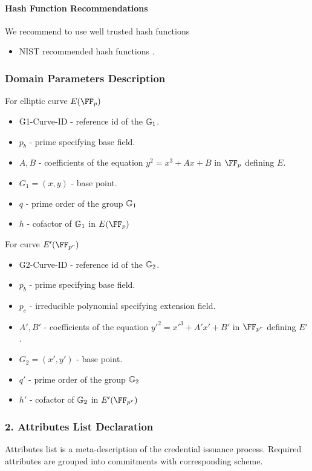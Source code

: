 \paragraph{Hash Function Recommendations}
We recommend to use well trusted hash functions
\begin{itemize}[label=$\circ$]
    \item NIST recommended hash functions \cite{nist-hash}. 
\end{itemize}
\subsubsection*{Domain Parameters Description}
For elliptic curve $E(\FF_p)$
\begin{itemize}[label=$\circ$]
    \item \textsf{G1-Curve-ID} - reference id of the $\mathbb{G}_1$.
    \item $p_b$ - prime specifying base field.
    \item $A, B$ - coefficients of the equation $y^2 = x^3 + Ax + B$ in $\FF_p$ defining $E$.
    \item $G_1 = (x, y)$ - base point.
    \item $q$ - prime order of the group $\mathbb{G}_1$
    \item $h$ - cofactor of $\mathbb{G}_1$ in $E(\FF_p)$
\end{itemize}
For curve $E'(\FF_{p^r})$
\begin{itemize}[label=$\circ$]
    \item \textsf{G2-Curve-ID} - reference id of the $\mathbb{G}_2$.
    \item $p_b$ - prime specifying base field.
    \item $p_e$ - irreducible polynomial specifying extension field.
    \item $A', B'$ - coefficients of the equation $y'^2 = x'^3 + A'x' + B'$ in $\FF_{p^r}$ defining $E'$.
    \item $G_2 = (x', y')$ - base point.
    \item $q'$ - prime order of the group $\mathbb{G}_2$
    \item $h'$ - cofactor of $\mathbb{G}_2$ in $E'(\FF_{p^r})$
\end{itemize}


\subsubsection{2. Attributes List Declaration}
Attributes list is a meta-description of the credential issuance process. Required attributes are grouped into commitments with corresponding scheme. 

